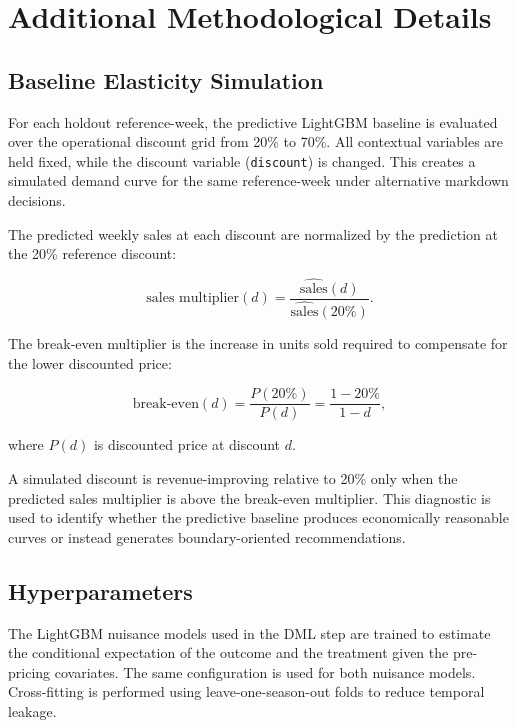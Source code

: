 
\chapter{Additional Methodological Details}

\label{AppendixA}


\section{Baseline Elasticity Simulation}

For each holdout reference-week, the predictive LightGBM baseline is evaluated over the operational discount grid from 20\% to 70\%. All contextual variables are held fixed, while the discount variable (\texttt{discount}) is changed. This creates a simulated demand curve for the same reference-week under alternative markdown decisions.

The predicted weekly sales at each discount are normalized by the prediction at the 20\% reference discount:

\begin{equation}
\text{sales multiplier}(d) =
\frac{\widehat{\text{sales}}(d)}
{\widehat{\text{sales}}(20\%)}.
\end{equation}

The break-even multiplier is the increase in units sold required to compensate for the lower discounted price:

\begin{equation}
\text{break-even}(d) =
\frac{P(20\%)}
{P(d)}
=
\frac{1-20\%}{1-d},
\end{equation}

where $P(d)$ is discounted price at discount $d$.

A simulated discount is revenue-improving relative to 20\% only when the predicted sales multiplier is above the break-even multiplier. This diagnostic is used to identify whether the predictive baseline produces economically reasonable curves or instead generates boundary-oriented recommendations.

\section{Hyperparameters}

The LightGBM nuisance models used in the DML step are trained to estimate the conditional expectation of the outcome and the treatment given the pre-pricing covariates. The same configuration is used for both nuisance models. Cross-fitting is performed using leave-one-season-out folds to reduce temporal leakage.

